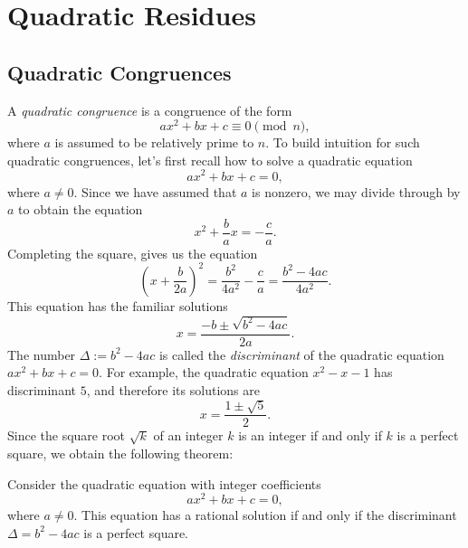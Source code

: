 \chapter{Quadratic Residues}\label{chapter:quadratic-residues}

\section{Quadratic Congruences}

A \emph{quadratic congruence} is a congruence of the form
\begin{equation*}
  ax^2 + bx + c \equiv 0 \pmod{n},
\end{equation*}
where $a$ is assumed to be relatively prime to $n$. To build intuition for such quadratic congruences, let's first recall how to solve a quadratic equation
\begin{equation*}
  ax^2 + bx + c = 0,
\end{equation*}
where $a\neq 0$. Since we have assumed that $a$ is nonzero, we may divide through by $a$ to obtain the equation
\begin{equation*}
  x^2 + \frac{b}{a}x = -\frac{c}{a}.
\end{equation*}
Completing the square, gives us the equation
\begin{equation*}
  \left(x + \frac{b}{2a}\right)^2 = \frac{b^2}{4a^2}-\frac{c}{a}=\frac{b^2-4ac}{4a^2}.
\end{equation*}
This equation has the familiar solutions
\begin{equation*}
  x = \frac{-b\pm\sqrt{b^2-4ac}}{2a}.
\end{equation*}
The number $\Delta:=b^2-4ac$ is called the \emph{discriminant} of the quadratic equation $ax^2+bx+c=0$. For example, the quadratic equation $x^2 - x - 1$ has discriminant $5$, and therefore its solutions are
\begin{equation*}
  x=\frac{1\pm\sqrt{5}}{2}.
\end{equation*}
Since the square root $\sqrt{k}$ of an integer $k$ is an integer if and only if $k$ is a perfect square, we obtain the following theorem:

\begin{theorem}
  Consider the quadratic equation with integer coefficients
  \begin{equation*}
    ax^2 + bx + c = 0,
  \end{equation*}
  where $a\neq 0$. This equation has a rational solution if and only if the discriminant $\Delta=b^2-4ac$ is a perfect square.
\end{theorem}

